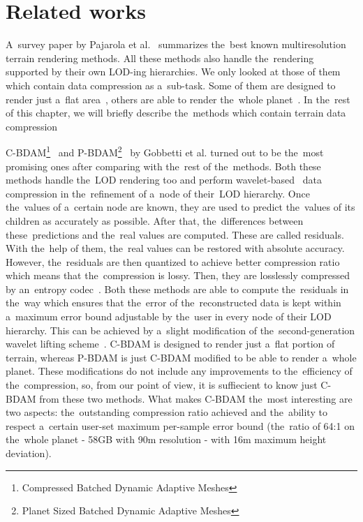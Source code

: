 \chapter{Related works}\label{chap:related_works}

 A~survey paper by Pajarola et al.~\cite{survey} summarizes the~best known multiresolution terrain rendering methods. All these methods also handle the~rendering supported by their own LOD-ing hierarchies. We only looked at those of them which contain data compression as a~sub-task. Some of them are designed to render just a~flat area~\cite{cbdam, jpeg2000terrain, meshesGPU1, meshesGPU2}, others are able to render the~whole planet~\cite{pbdam, meshes}. In the~rest of this chapter, we will briefly describe the~methods which contain terrain data compression
 
 C-BDAM\footnote{Compressed Batched Dynamic Adaptive Meshes}~\cite{cbdam} and P-BDAM\footnote{Planet Sized Batched Dynamic Adaptive Meshes}~\cite{pbdam} by Gobbetti et al. turned out to be the~most promising ones after comparing with the~rest of the~methods. Both these methods handle the~LOD rendering too and perform wavelet-based~\cite{waveletsTutorial} data compression in the~refinement of a~node of their~LOD hierarchy. Once the~values of a~certain node are known, they are used to predict the~values of its children as accurately as possible. After that, the~differences between these~predictions and the~real values are computed. These are called residuals. With the~help of them, the~real values can be restored with absolute accuracy. However, the~residuals are then quantized to achieve better compression ratio which means that the~compression is lossy. Then, they are losslessly compressed by an~entropy codec~\cite{entropy1, entropy2}. Both these methods are able to compute the~residuals in the~way which ensures that the~error of the~reconstructed data is kept within a~maximum error bound adjustable by the~user in every node of their LOD hierarchy. This can be achieved by a~slight modification of the~second-generation wavelet lifting scheme~\cite{two-stage}. C-BDAM is designed to render just a~flat portion of terrain, whereas P-BDAM is just C-BDAM modified to be able to render a~whole planet. These modifications do not include any improvements to the~efficiency of the~compression, so, from our point of view, it is suffiecient to know just C-BDAM from these two methods. What makes C-BDAM the~most interesting are two aspects: the~outstanding compression ratio achieved and the~ability to respect a~certain user-set maximum per-sample error bound (the~ratio of 64:1 on the~whole planet - 58GB with 90m resolution - with 16m maximum height deviation).
 
